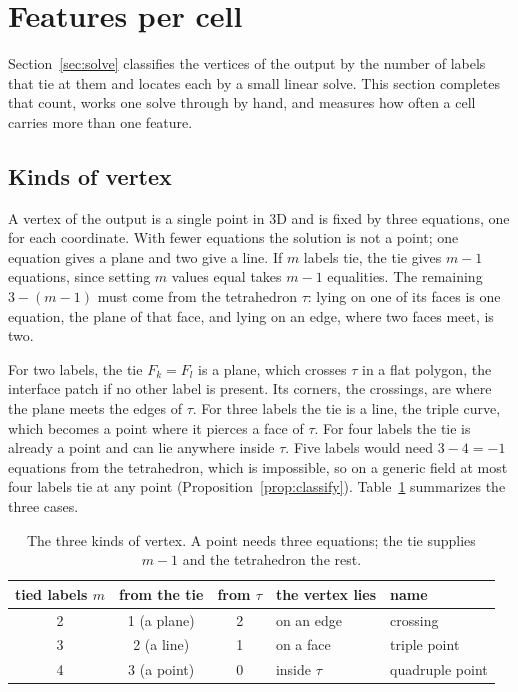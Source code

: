 \documentclass[11pt]{article}
\theoremstyle{definition}
\newcommand{\tet}{\tau}
\newcommand{\interp}{F}
\begin{document}
\section{Features per cell}
\label{sec:features-supp}

Section~\ref{sec:solve} classifies the vertices of the output by the number
of labels that tie at them and locates each by a small linear solve. This
section completes that count, works one solve through by hand, and measures
how often a cell carries more than one feature.

\subsection{Kinds of vertex}

A vertex of the output is a single point in 3D and is fixed by three
equations, one for each coordinate. With fewer equations the solution is not
a point; one equation gives a plane and two give a line. If $m$ labels tie, the
tie gives $m-1$ equations, since setting $m$ values equal takes $m-1$
equalities. The remaining $3-(m-1)$ must come from the tetrahedron $\tet$:
lying on one of its faces is one equation, the plane of that face, and lying
on an edge, where two faces meet, is two.

For two labels, the tie $\interp_k = \interp_l$ is a plane, which crosses
$\tet$ in a flat polygon, the interface patch if no other label is present.
Its corners, the crossings, are where the plane meets the edges of $\tet$.
For three labels the
tie is a line, the triple curve, which becomes a point where it pierces a face
of $\tet$. For four labels the tie is already a point and can lie anywhere
inside $\tet$. Five labels would need $3-4=-1$ equations from the
tetrahedron, which is impossible, so on a generic field at most four labels
tie at any point (Proposition~\ref{prop:classify}).
Table~\ref{tab:vertexkinds} summarizes the three cases.

\begin{table}[htbp]
\centering
\caption{The three kinds of vertex. A point needs three equations; the tie
supplies $m-1$ and the tetrahedron the rest.}
\label{tab:vertexkinds}
\begin{tabular}{@{}cccll@{}}
\toprule
tied labels $m$ & from the tie & from $\tet$ & the vertex lies & name \\
\midrule
2 & 1 (a plane) & 2 & on an edge & crossing \\
3 & 2 (a line)  & 1 & on a face & triple point \\
4 & 3 (a point) & 0 & inside $\tet$ & quadruple point \\
\bottomrule
\end{tabular}
\end{table}
\end{document}
